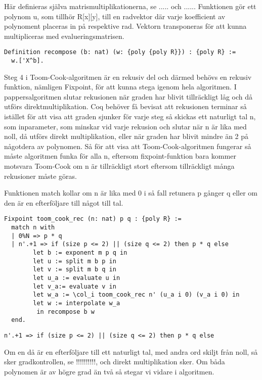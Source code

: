 Här definieras själva matrismultiplikationerna, se ..... och ...... Funktionen
 gör ett polynom u, som tillhör R[x][y], till en radvektor där varje
koefficient av polynoment placeras in på respektive rad. Vektorn transponeras
för att kunna multipliceras med evalueringsmatrisen.

\begin{lstlisting}
Definition recompose (b: nat) (w: {poly {poly R}}) : {poly R} :=
  w.['X^b].
\end{lstlisting}

Steg 4 i Toom-Cook-algoritmen är en rekusiv del och därmed behövs en rekusiv
funktion, nämligen Fixpoint, för att kunna stega igenom hela algoritmen. I
pappersalgoritmen slutar rekusionen när graden har blivit tillräckligt låg och
då utförs direktmultiplikation. Coq behöver få bevisat att rekusionen terminar
så istället för att visa att graden sjunker för varje steg så skickas ett
naturligt tal n, som inparameter, som minskar vid varje rekusion och slutar när
n är lika med noll, då utförs direkt multiplikation, eller när graden har
blivit mindre än 2 på någotdera av polynomen. Så för att visa att
Toom-Cook-algoritmen fungerar så måste algoritmen funka för alla n, eftersom
fixpoint-funktion bara kommer motsvara Toom-Cook om n är tillräckligt stort
eftersom tillräckligt många rekusioner måste göras.

Funktionen match kollar om n är lika med 0 i så fall retunera p gånger q eller
om den är en efterföljare till något till tal.

\begin{lstlisting}
Fixpoint toom_cook_rec (n: nat) p q : {poly R} :=
  match n with
  | 0%N => p * q
  | n'.+1 => if (size p <= 2) || (size q <= 2) then p * q else
        let b := exponent m p q in
        let u := split m b p in
        let v := split m b q in
        let u_a := evaluate u in
        let v_a:= evaluate v in
        let w_a := \col_i toom_cook_rec n' (u_a i 0) (v_a i 0) in
        let w := interpolate w_a
         in recompose b w
  end.
\end{lstlisting}

\begin{lstlisting}
n'.+1 => if (size p <= 2) || (size q <= 2) then p * q else
\end{lstlisting}

Om en  då är en efterföljare till ett naturligt tal, med andra ord skiljt
från noll, så sker gradkontrollen, se !!!!!!!!!!, och direkt multiplikation
sker. Om båda polynomen är av högre grad än två så stegar vi vidare i
algoritmen.

